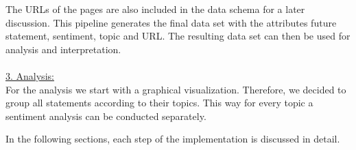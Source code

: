 The URLs of the pages are also included in the data schema for a later discussion. This pipeline generates the final data set with the attributes future statement, sentiment, topic and URL. The resulting data set can then be used for analysis and interpretation. 
\\
\\
\underline{3. Analysis:}
\\
For the analysis we start with a graphical visualization. 
Therefore, we decided to group all statements according to their topics. 
This way for every topic a sentiment analysis can be conducted separately. 

 

In the following sections, each step of the implementation is discussed in detail. 


\begin{table}
\setlength\tabcolsep{2pt} %
\footnotesize\centering
\captionsetup{size=footnotesize}
\resizebox{\columnwidth}{!}{%
\begin{tabular}{
    cccc}

\hline

\textbf{statement} & \textbf{Sentiment} & \textbf{Topic} & \textbf{url} \\
\hline
AI can be a risk for many workers. & NEG & finances & ...\\
AI will definitely revolutionize games! & POS &  gaming & ...\\
... & ... & ... & ... \\
\hline
\end{tabular}}
\caption{\label{data-schema}
Data schema for visualization and analysis
}
\end{table}


